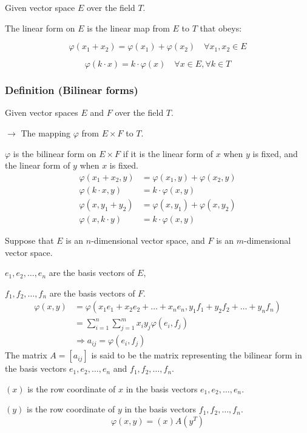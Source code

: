 Given vector space $E$ over the field $T$.

The linear form on $E$ is the linear map from $E$ to $T$ that obeys:

\[
\varphi(x_1 + x_2) = \varphi(x_1) + \varphi(x_2) \quad \forall x_1, x_2 \in E
\]

\[
\varphi(k \cdot x) = k \cdot \varphi(x) \quad \forall x \in E, \forall k \in T
\]

\subsubsection{Definition (Bilinear forms)}

Given vector spaces $E$ and $F$ over the field $T$.

$\rightarrow$ The mapping $\varphi$ from $E \times F$ to $T$.

$\varphi$ is the bilinear form on $E \times F$ if it is the linear form of $x$ when $y$ is fixed, and the linear form of $y$ when $x$ is fixed.
\begin{align*}
    \varphi(x_1 + x_2, y) &= \varphi(x_1, y) + \varphi(x_2, y)\\
    \varphi(k \cdot x, y) &= k \cdot \varphi(x, y)\\
    \varphi(x, y_1 + y_2) &= \varphi(x, y_1) + \varphi(x, y_2)\\
    \varphi(x, k \cdot y) &= k \cdot \varphi(x, y)
\end{align*}


Suppose that $E$ is an $n$-dimensional vector space, and $F$ is an $m$-dimensional vector space.

$e_1, e_2, \ldots, e_n$ are the basis vectors of $E$,

$f_1, f_2, \ldots, f_n$ are the basis vectors of $F$.
\begin{align*}
    \varphi(x, y) &= \varphi(x_1 e_1 + x_2 e_2 + \ldots + x_n e_n, y_1 f_1 + y_2 f_2 + \ldots + y_n f_n)\\
    &= \sum^n_{i=1}\sum^m_{j=1}x_iy_j\varphi(e_i, f_j)\\
    &\Rightarrow a_{ij} = \varphi(e_i, f_j)
\end{align*}
The matrix $A = [a_{ij}]$ is said to be the matrix representing the bilinear form in the basis vectors $e_1, e_2, \ldots, e_n$ and $f_1, f_2, \ldots, f_n$.

$(x)$ is the row coordinate of $x$ in the basis vectors $e_1, e_2, \ldots, e_n$.

$(y)$ is the row coordinate of $y$ in the basis vectors $f_1, f_2, \ldots, f_n$.
\[
\varphi(x, y) = (x) A (y^T)
\]

